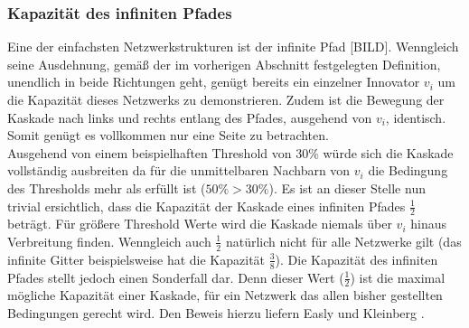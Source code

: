 \documentclass[12pt]{article}
\begin{document}
\subsubsection{Kapazität des infiniten Pfades}
\label{sss_kapinfinit}
Eine der einfachsten Netzwerkstrukturen ist der infinite Pfad [BILD]. Wenngleich seine Ausdehnung, gemäß der im vorherigen Abschnitt festgelegten Definition, unendlich in beide Richtungen geht, genügt bereits ein einzelner Innovator $v_i$ um die Kapazität dieses Netzwerks zu demonstrieren. Zudem ist die Bewegung der Kaskade nach links und rechts entlang des Pfades, ausgehend von $v_i$, identisch. Somit genügt es vollkommen nur eine Seite zu betrachten.\\
Ausgehend von einem beispielhaften Threshold von $30\%$ würde sich die Kaskade vollständig ausbreiten da für die unmittelbaren Nachbarn von $v_i$ die Bedingung des Thresholds mehr als erfüllt ist ($50\% > 30\%$). Es ist an dieser Stelle nun trivial ersichtlich, dass die Kapazität der Kaskade eines infiniten Pfades $\frac{1}{2}$ beträgt. Für größere Threshold Werte wird die Kaskade niemals über $v_i$ hinaus Verbreitung finden. Wenngleich auch $\frac{1}{2}$ natürlich nicht für alle Netzwerke gilt (das infinite Gitter beispielsweise hat die Kapazität $\frac{3}{8}$). Die Kapazität des infiniten Pfades stellt jedoch einen Sonderfall dar. Denn dieser Wert ($\frac{1}{2}$) ist die maximal mögliche Kapazität einer Kaskade, für ein Netzwerk das allen bisher gestellten Bedingungen gerecht wird. Den Beweis hierzu liefern Easly und Kleinberg \cite{Easly10}. 
\end{document}
